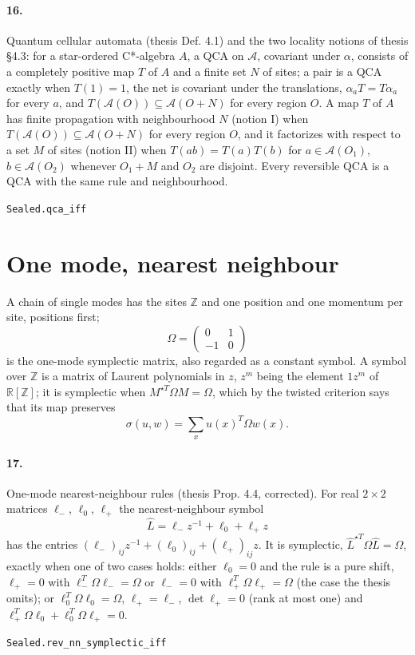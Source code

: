 \documentclass[11pt]{article}
\begin{document}
\paragraph{16.} Quantum cellular automata (thesis Def. 4.1) and the two locality notions of thesis §4.3: for a star-ordered C*-algebra $A$, a QCA on $\mathcal A$, covariant under $\alpha$, consists of a completely positive map $T$ of $A$ and a finite set $N$ of sites; a pair is a QCA exactly when $T(1) = 1$, the net is covariant under the translations, $\alpha_a T = T \alpha_a$ for every $a$, and $T(\mathcal A(O)) \subseteq \mathcal A(O + N)$ for every region $O$. A map $T$ of $A$ has finite propagation with neighbourhood $N$ (notion I) when $T(\mathcal A(O)) \subseteq \mathcal A(O + N)$ for every region $O$, and it factorizes with respect to a set $M$ of sites (notion II) when $T(ab) = T(a) T(b)$ for $a \in \mathcal A(O_1)$, $b \in \mathcal A(O_2)$ whenever $O_1 + M$ and $O_2$ are disjoint. Every reversible QCA is a QCA with the same rule and neighbourhood.\par{\footnotesize\texttt{Sealed.qca\_iff}}

\section*{One mode, nearest neighbour}
A chain of single modes has the sites $\mathbb Z$ and one position and one momentum per site, positions first; \[\Omega = \begin{pmatrix} 0 & 1 \\ -1 & 0 \end{pmatrix}\] is the one-mode symplectic matrix, also regarded as a constant symbol. A symbol over $\mathbb Z$ is a matrix of Laurent polynomials in $z$, $z^m$ being the element $1 z^m$ of $\mathbb R[\mathbb Z]$; it is symplectic when $M^{\star T} \Omega M = \Omega$, which by the twisted criterion says that its map preserves \[\sigma(u, w) = \sum_x u(x)^T \Omega w(x).\]

\paragraph{17.} One-mode nearest-neighbour rules (thesis Prop. 4.4, corrected). For real $2 \times 2$ matrices $\ell_-$, $\ell_0$, $\ell_+$ the nearest-neighbour symbol \[\hat L = \ell_- z^{-1} + \ell_0 + \ell_+ z\] has the entries $(\ell_-)_{ij} z^{-1} + (\ell_0)_{ij} + (\ell_+)_{ij} z$. It is symplectic, $\hat L^{\star T} \Omega \hat L = \Omega$, exactly when one of two cases holds: either $\ell_0 = 0$ and the rule is a pure shift, $\ell_+ = 0$ with $\ell_-^T \Omega \ell_- = \Omega$ or $\ell_- = 0$ with $\ell_+^T \Omega \ell_+ = \Omega$ (the case the thesis omits); or $\ell_0^T \Omega \ell_0 = \Omega$, $\ell_+ = \ell_-$, $\det \ell_+ = 0$ (rank at most one) and $\ell_+^T \Omega \ell_0 + \ell_0^T \Omega \ell_+ = 0$.\par{\footnotesize\texttt{Sealed.rev\_nn\_symplectic\_iff}}
\end{document}
